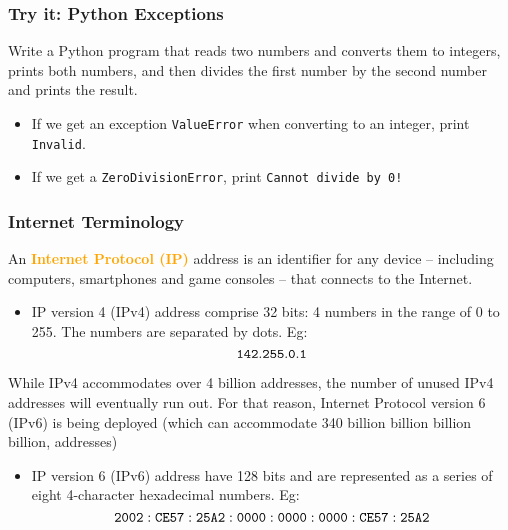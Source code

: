 \documentclass[xcolor=svgnames]{beamer}
\newcommand{\define}[1]{\textbf{\textcolor{orange}{#1}}}
\newcommand{\ft}[1]{\frametitle{#1}}
\begin{document}
\begin{frame}\ft{Try it: Python Exceptions}
\begin{example}
 Write a Python program that reads two numbers and converts them to integers, prints both numbers, and then divides the first number by the second number and prints the result. 
\begin{itemize}
\item If we get an exception {\tt ValueError} when converting to an integer, print {\tt Invalid}.
\item If we get a {\tt ZeroDivisionError}, print {\tt Cannot divide by 0!}
\end{itemize}
\end{example}
\end{frame}




\begin{frame}\ft{Internet Terminology}
\vfill
An \define{Internet Protocol (IP)} address is an identifier for %
any device -- including computers, smartphones and game consoles -- that connects to the Internet.%
\vfill
\begin{itemize}
\item IP version 4 (IPv4) address comprise 32 bits: 4 numbers in the range of 0 to 255.  The numbers are separated by dots. Eg: 
$${\tt 142.255.0.1}$$
\vfill
\end{itemize}
While IPv4 accommodates over 4 billion addresses, the number of unused IPv4 addresses will eventually run out.  For that reason, Internet Protocol version 6 (IPv6) is being deployed %
(which can accommodate 340 billion billion billion billion, addresses)
\vfill
\begin{itemize}
\item IP version 6 (IPv6) address have 128 bits and are %
represented as a series of eight 4-character hexadecimal numbers.  Eg: 
$${\tt 2002:CE57:25A2:0000:0000:0000:CE57:25A2}$$
\vfill
\end{itemize}
\end{frame}
\end{document}
